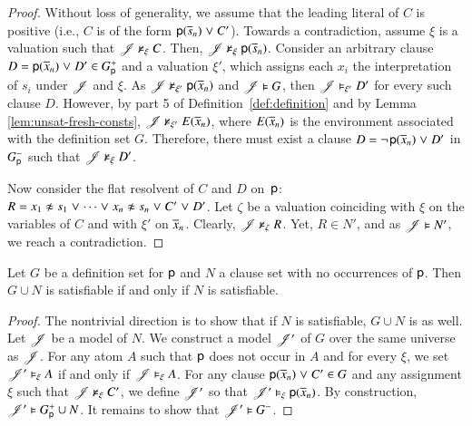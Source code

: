 \begin{rep}
\begin{proof}
      Without loss of generality,
      we assume that the leading literal of $C$ is positive (i.e., $C$ is of the form ${\mathsf{p}(\overline{s}_{n})} \mathrel{\lor} C'$).
      Towards a contradiction, assume $\xi$ is a valuation such that $\mathscr{J} \nvDash_\xi C$. Then, $\mathscr{J} \nvDash_\xi
      {\mathsf{p}(\overline{s}_{n})}$. 
      Consider an arbitrary clause $D = {\mathsf{p}}(\overline{x}_{n}) \mathrel{\lor} D'
      \in G^+_{\mathsf{p}}$ and a valuation $\xi'$, which assigns each $x_i$ the
      interpretation of $s_i$ under $\mathscr{J}$ and $\xi$. As $\mathscr{J} \nvDash_{\xi'}
      {\mathsf{p}}(\overline{x}_{n})$ and $\mathscr{J} \vDash G$, then $\mathscr{J} \vDash_{\xi'} D'$ for every
      such clause $D$.
      However, by part 5 of Definition~\ref{def:definition} and by Lemma
      \ref{lem:unsat-fresh-consts}, $\mathscr{J} \nvDash_{\xi'} E(\overline{x}_{n})$, where $E(\overline{x}_{n})$
      is the environment associated with the definition set $G$.
      Therefore, there must exist a clause $D =
      \neg{\kern.2ex \relax{\mathsf{p}(\overline{x}_{n})}} \mathrel{\lor} D'$ in $G^-_{\mathsf{p}}$ such
      that $\mathscr{J} \nvDash_\xi D'$.


      Now consider the flat resolvent of $C$ and $D$ on~$\mathsf{p}$: $R =
      \neqlit{x_1}{s_1} \cor \cdots \cor \neqlit{x_n}{s_n} \cor C' \cor D'$.
      Let $\zeta$ be a valuation coinciding with $\xi$ on the variables of $C$
      and with $\xi'$ on $\overline{x}_{n}$.
      Clearly, $\mathscr{J} \nvDash_\zeta R$. Yet, $R \in N'$, and as $\mathscr{J} \vDash N'$, we reach a contradiction.
   \end{proof}

   \begin{lemma}
      \label{lem:flat-res-set-last-step-satisfiability}
      Let $G$ be a definition set for $\mathsf{p}$\confrep{,}{} and $N$ a clause set with no occurrences of $\mathsf{p}$.
      Then $G \cup N$ is satisfiable if and only if $N$ is satisfiable.
   \end{lemma}
   \begin{proof}
      The nontrivial direction is to show that if $N$ is satisfiable, $G \cup N$ is as well.
      Let $\mathscr{J}$ be a model of $N$. We construct a model $\mathscr{J}'$ of $G$ over
      the same universe as $\mathscr{J}$. For any atom $A$ such that $\mathsf{p}$ does not
      occur in $A$ and for every $\xi$, we set $\mathscr{J}' \vDash_\xi A$ if and only if
      $\mathscr{J} \vDash_\xi A$. For any clause ${\mathsf{p}(\overline{x}_{n})} \mathrel{\lor}
      C' \in G$ and any assignment $\xi$ such that $\mathscr{J} \nvDash_\xi C'$, we
      define $\mathscr{J}'$ so that $\mathscr{J}'\vDash_\xi \mathsf{p}(\overline{x}_{n})$. By
      construction, $\mathscr{J}' \vDash G^+_{\mathsf{p}} \cup N$. It remains to show that $\mathscr{J}' \vDash
      G^-_{}$.


\end{proof}
\end{rep}
